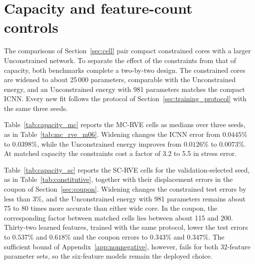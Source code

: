 \section{Capacity and feature-count controls}
\label{app:capacity}
The comparisons of Section~\ref{sec:cell} pair compact constrained cores with a larger Unconstrained network.  To separate the effect of the constraints from that of capacity, both benchmarks complete a two-by-two design.  The constrained cores are widened to about 25\,000 parameters, comparable with the Unconstrained energy, and an Unconstrained energy with 981 parameters matches the compact ICNN.  Every new fit follows the protocol of Section~\ref{sec:training_protocol} with the same three seeds.

Table~\ref{tab:capacity_mc} reports the MC-RVE cells as medians over three seeds, as in Table~\ref{tab:mc_rve_m06}.  Widening changes the ICNN error from $0.0445\%$ to $0.0398\%$, while the Unconstrained energy improves from $0.0126\%$ to $0.0073\%$.  At matched capacity the constraints cost a factor of 3.2 to 5.5 in stress error.

Table~\ref{tab:capacity_sc} reports the SC-RVE cells for the validation-selected seed, as in Table~\ref{tab:constitutive}, together with their displacement errors in the coupon of Section~\ref{sec:coupon}.  Widening changes the constrained test errors by less than $3\%$, and the Unconstrained energy with 981 parameters remains about 75 to 80 times more accurate than either wide core.  In the coupon, the corresponding factor between matched cells lies between about 115 and 200.  Thirty-two learned features, trained with the same protocol, lower the test errors to $0.537\%$ and $0.618\%$ and the coupon errors to $0.343\%$ and $0.347\%$.  The sufficient bound of Appendix~\ref{app:nonnegative}, however, fails for both 32-feature parameter sets, so the six-feature models remain the deployed choice.

\begin{table}[htbp]
 \centering\small
 \caption{MC-RVE capacity controls: independent-test errors, in percent.}
 \label{tab:capacity_mc}
 
\end{table}

\begin{table}[htbp]
 \centering\small
 \caption{SC-RVE capacity and feature-count controls, in percent.}
 \label{tab:capacity_sc}
 
\end{table}
